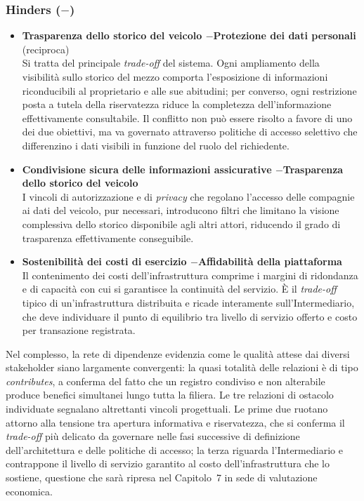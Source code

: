 \subsubsection*{Hinders ($-$)}

\begin{itemize}
    \item \textbf{Trasparenza dello storico del veicolo \quad$-$\quad Protezione dei dati personali} (reciproca)\\
    Si tratta del principale \textit{trade-off} del sistema. Ogni ampliamento della visibilit\`a sullo storico del mezzo comporta l'esposizione di informazioni riconducibili al proprietario e alle sue abitudini; per converso, ogni restrizione posta a tutela della riservatezza riduce la completezza dell'informazione effettivamente consultabile. Il conflitto non pu\`o essere risolto a favore di uno dei due obiettivi, ma va governato attraverso politiche di accesso selettivo che differenzino i dati visibili in funzione del ruolo del richiedente.

    \item \textbf{Condivisione sicura delle informazioni assicurative \quad$-$\quad Trasparenza dello storico del veicolo}\\
    I vincoli di autorizzazione e di \textit{privacy} che regolano l'accesso delle compagnie ai dati del veicolo, pur necessari, introducono filtri che limitano la visione complessiva dello storico disponibile agli altri attori, riducendo il grado di trasparenza effettivamente conseguibile.

    \item \textbf{Sostenibilit\`a dei costi di esercizio \quad$-$\quad Affidabilit\`a della piattaforma}\\
    Il contenimento dei costi dell'infrastruttura comprime i margini di ridondanza e di capacit\`a con cui si garantisce la continuit\`a del servizio. \`E il \textit{trade-off} tipico di un'infrastruttura distribuita e ricade interamente sull'Intermediario, che deve individuare il punto di equilibrio tra livello di servizio offerto e costo per transazione registrata.
\end{itemize}

Nel complesso, la rete di dipendenze evidenzia come le qualit\`a attese dai diversi stakeholder siano largamente convergenti: la quasi totalit\`a delle relazioni \`e di tipo \textit{contributes}, a conferma del fatto che un registro condiviso e non alterabile produce benefici simultanei lungo tutta la filiera. Le tre relazioni di ostacolo individuate segnalano altrettanti vincoli progettuali. Le prime due ruotano attorno alla tensione tra apertura informativa e riservatezza, che si conferma il \textit{trade-off} pi\`u delicato da governare nelle fasi successive di definizione dell'architettura e delle politiche di accesso; la terza riguarda l'Intermediario e contrappone il livello di servizio garantito al costo dell'infrastruttura che lo sostiene, questione che sar\`a ripresa nel Capitolo~7 in sede di valutazione economica.
